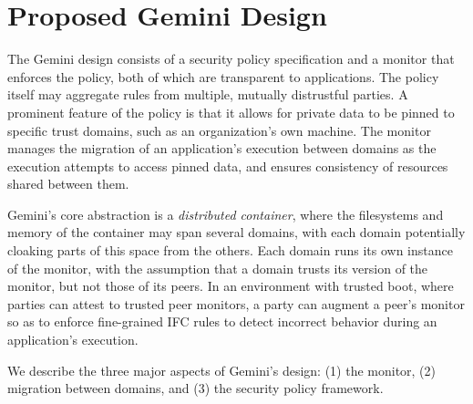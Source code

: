 \section{Proposed Gemini Design}
\label{sec:gemini-design}
%
%

The Gemini design consists of a security policy specification and a monitor
that enforces the policy, both of which are transparent to applications.
%
The policy itself may aggregate rules from multiple, mutually
distrustful parties.
%
A prominent feature of the policy is that it allows for private data to be pinned
to specific trust domains, such as an organization's own machine.
%
The monitor manages the migration of an application's execution between domains
as the execution attempts to access pinned data, and ensures consistency of
resources shared between them.


Gemini's core abstraction is a \emph{distributed container},
where the filesystems and memory of the container may span several
domains, with each domain potentially cloaking parts of this space from the
others.
%
Each domain runs its own instance of the monitor, with the assumption that a
domain trusts its version of the monitor, but not those of its peers.
%
In an environment with trusted boot, where parties can attest to trusted peer
monitors, a party can augment a peer's monitor so as to enforce fine-grained
IFC rules to detect incorrect behavior during an application's execution.


We describe the three major aspects of Gemini's design: (1) the monitor, (2)
migration between domains, and (3) the security policy framework.
%
%


